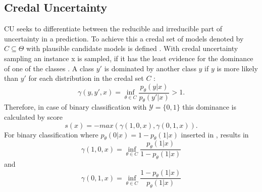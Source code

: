 \subsection{Credal Uncertainty}  
\label{subsec:credal_uncertainty}

\ac{CU} seeks to differentiate between the reducible and irreducible part of uncertainty in a prediction.
To achieve this a credal set of models denoted by $C \subseteq \Theta$ with plausible candidate models is defined \cite{nguyen2021howtomeasure}.
With credal uncertainty sampling an instance x is sampled, if it has the least evidence for the dominance of one of the classes \cite{nguyen2021howtomeasure}.
A class $y'$ is dominated by another class $y$ if $y$ is more likely than $y'$ for each distribution in the credal set $C$ \cite{nguyen2021howtomeasure}:
\begin{equation} \label{eq:credal_uncertainty_dominance}
\gamma(y,y',x) = \inf_{\theta \in C} \frac{p_{\theta}(y | x)}{p_{\theta}(y' | x)} > 1.
\end{equation} 
Therefore, in case of binary classification with $\mathcal{Y} = \{0, 1\}$ this dominance is calculated by score
\begin{equation}
    s(x) = -max (\gamma(1,0,x), \gamma(0,1,x)).
\end{equation} 
For binary classification where $p_{\theta}(0|x) = 1 - p_{\theta}(1|x)$ inserted in , results in  
\begin{equation}
\gamma(1,0,x) = \inf_{\theta \in C} \frac{p_{\theta}(1 | x)}{1 - p_{\theta}(1 | x)}
\end{equation} 
and
\begin{equation}
\gamma(0,1,x) = \inf_{\theta \in C} \frac{1 - p_{\theta}(1 | x)}{p_{\theta}(1 | x)}
\end{equation} 